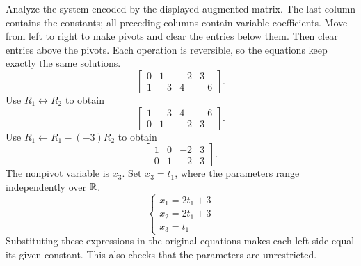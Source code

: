 \goal Analyze the system encoded by the displayed augmented matrix. The last column contains the constants; all preceding columns contain variable coefficients.
\idea Move from left to right to make pivots and clear the entries below them. Then clear entries above the pivots. Each operation is reversible, so the equations keep exactly the same solutions.
\[ \left[\begin{array}{rrr|r}0&1&-2&3\\1&-3&4&-6\end{array}\right].\]
Use $R_{1}\leftrightarrow R_{2}$ to obtain
\[ \left[\begin{array}{rrr|r}1&-3&4&-6\\0&1&-2&3\end{array}\right].\]
Use $R_{1}\leftarrow R_{1}-(-3)R_{2}$ to obtain
\[ \left[\begin{array}{rrr|r}1&0&-2&3\\0&1&-2&3\end{array}\right].\]
The nonpivot variable is $x_{3}$. Set $x_{3}=t_{1}$, where the parameters range independently over $\mathbb{R}$.
\[ \begin{cases}x_{1}=2 t_{1} + 3\\x_{2}=2 t_{1} + 3\\x_{3}=t_{1}\end{cases}\]
Substituting these expressions in the original equations makes each left side equal its given constant. This also checks that the parameters are unrestricted.

